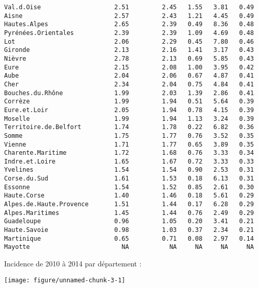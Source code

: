 \documentclass[11pt,a4paper]{article}\usepackage[]{graphicx}\usepackage[]{color}
\makeatletter
\def\maxwidth{ %
  \ifdim\Gin@nat@width>\linewidth
    \linewidth
  \else
    \Gin@nat@width
  \fi
}
\newenvironment{kframe}{%
 \def\at@end@of@kframe{}%
 \ifinner\ifhmode%
  \def\at@end@of@kframe{\end{minipage}}%
  \begin{minipage}{\columnwidth}%
 \fi\fi%
 \def\FrameCommand##1{\hskip\@totalleftmargin \hskip-\fboxsep
 \colorbox{shadecolor}{##1}\hskip-\fboxsep
     \hskip-\linewidth \hskip-\@totalleftmargin \hskip\columnwidth}%
 \MakeFramed {\advance\hsize-\width
   \@totalleftmargin\z@ \linewidth\hsize
   \@setminipage}}%
 {\par\unskip\endMakeFramed%
 \at@end@of@kframe}
\newenvironment{knitrout}{}{} %
\makeatother
\begin{document}
\begin{knitrout}
\begin{kframe}
\begin{verbatim}
Val.d.Oise                    2.51         2.45   1.55   3.81   0.49
Aisne                         2.57         2.43   1.21   4.45   0.49
Hautes.Alpes                  2.65         2.39   0.49   8.36   0.48
Pyrénées.Orientales           2.39         2.39   1.09   4.69   0.48
Lot                           2.06         2.29   0.45   7.80   0.46
Gironde                       2.13         2.16   1.41   3.17   0.43
Nièvre                        2.78         2.13   0.69   5.85   0.43
Eure                          2.15         2.08   1.00   3.95   0.42
Aube                          2.04         2.06   0.67   4.87   0.41
Cher                          2.34         2.04   0.75   4.84   0.41
Bouches.du.Rhône              1.99         2.03   1.39   2.86   0.41
Corrèze                       1.99         1.94   0.51   5.64   0.39
Eure.et.Loir                  2.05         1.94   0.78   4.15   0.39
Moselle                       1.99         1.94   1.13   3.24   0.39
Territoire.de.Belfort         1.74         1.78   0.22   6.82   0.36
Somme                         1.75         1.77   0.76   3.52   0.35
Vienne                        1.71         1.77   0.65   3.89   0.35
Charente.Maritime             1.72         1.68   0.76   3.33   0.34
Indre.et.Loire                1.65         1.67   0.72   3.33   0.33
Yvelines                      1.54         1.54   0.90   2.53   0.31
Corse.du.Sud                  1.61         1.53   0.18   6.13   0.31
Essonne                       1.54         1.52   0.85   2.61   0.30
Haute.Corse                   1.40         1.46   0.18   5.61   0.29
Alpes.de.Haute.Provence       1.51         1.44   0.17   6.28   0.29
Alpes.Maritimes               1.45         1.44   0.76   2.49   0.29
Guadeloupe                    0.96         1.05   0.20   3.41   0.21
Haute.Savoie                  0.98         1.03   0.37   2.34   0.21
Martinique                    0.65         0.71   0.08   2.97   0.14
Mayotte                         NA           NA     NA     NA     NA
\end{verbatim}
\end{kframe}
\end{knitrout}


Incidence de 2010 à 2014 par département :

\begin{knitrout}
\color{fgcolor}
\texttt{[image: figure/unnamed-chunk-3-1]} 

\end{knitrout}
\end{document}
